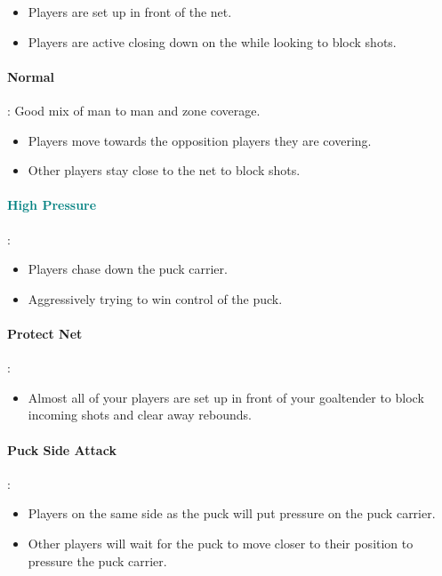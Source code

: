 \documentclass[10pt, french]{article}
\begin{document}
\begin{multicols*}{2}
\begin{itemize}[leftmargin = *]
	\item	Players are set up in front of the net.
	\item	Players are active closing down on the while looking to block shots.
\end{itemize}

\paragraph{Normal}: Good mix of man to man and zone coverage.

\begin{itemize}[leftmargin = *]
	\item	Players move towards the opposition players they are covering.
	\item	Other players stay close to the net to block shots.
\end{itemize}

\paragraph{\textcolor{teal}{High Pressure}}: 

\begin{itemize}[leftmargin = *]
	\item	Players chase down the puck carrier.
	\item	Aggressively trying to win control of the puck.
\end{itemize}

\paragraph{Protect Net}: 

\begin{itemize}[leftmargin = *]
	\item	Almost all of your players are set up in front of your goaltender to block incoming shots and clear away rebounds.
\end{itemize}

\paragraph{Puck Side Attack}: 

\begin{itemize}[leftmargin = *]
	\item	Players on the same side as the puck will put pressure on the puck carrier.
	\item	Other players will wait for the puck to move closer to their position to pressure the puck carrier.
\end{itemize}


\end{multicols*}
\end{document}
